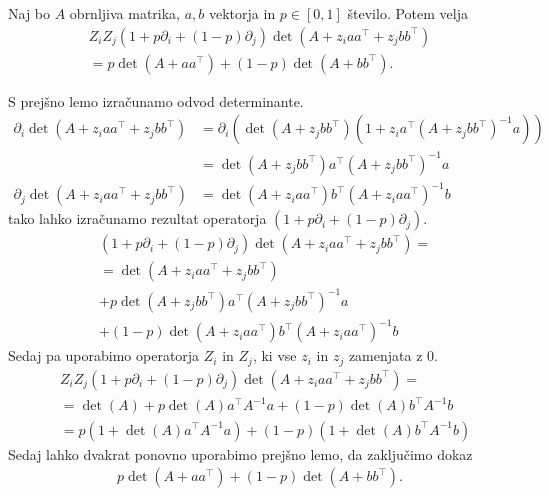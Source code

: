 \begin{lema}\label{zizj-odvod-determinante}
    Naj bo \(A\) obrnljiva matrika, \(a,b\) vektorja in \(p\in [0,1]\) število. Potem velja
    \begin{align*}
        Z_iZ_j(1+p\partial_i + (1-p)\partial_j)\det(A + z_i aa^\top+ z_j bb^\top) \\
        = p\det(A + aa^\top) + (1-p)\det(A+bb^\top).
    \end{align*}
\end{lema}
\begin{dokaz}
    S prejšno lemo izračunamo odvod determinante.
    \begin{align*}
        \partial_i \det(A + z_i aa^\top +z_j bb^\top) & =\partial_i \left(\det(A + z_j bb^\top) (1+ z_i a^\top (A + z_j bb^\top)^{-1} a)\right) \\
                                                      & = \det(A + z_j bb^\top) a^\top (A + z_j bb^\top)^{-1} a                                 \\
        \partial_j \det(A + z_i aa^\top +z_j bb^\top) & = \det(A + z_i aa^\top) b^\top (A + z_i aa^\top)^{-1} b
    \end{align*}
    tako lahko izračunamo rezultat operatorja \((1+p\partial_i + (1-p)\partial_j)\).
    \begin{align*}
         & (1+p\partial_i + (1-p)\partial_j)\det(A + z_i aa^\top + z_j bb^\top) = \\
         & = \det(A + z_i aa^\top + z_j bb^\top)                                  \\
         & + p\det(A + z_j bb^\top) a^\top (A + z_j bb^\top)^{-1} a               \\
         & + (1-p)\det(A + z_i aa^\top) b^\top (A + z_i aa^\top)^{-1} b
    \end{align*}
    Sedaj pa uporabimo operatorja \(Z_i\) in \(Z_j\), ki vse \(z_i\) in \(z_j\) zamenjata z \(0\).
    \begin{align*}
         & Z_iZ_j(1+p\partial_i + (1-p)\partial_j)\det(A + z_i aa^\top+ z_j bb^\top) = \\
         & =\det(A) + p\det(A) a^\top A^{-1} a + (1-p)\det(A) b^\top A^{-1} b          \\
         & = p(1+\det(A) a^\top A^{-1}a) + (1-p)(1+\det(A)b^\top A^{-1} b)
    \end{align*}
    Sedaj lahko dvakrat ponovno uporabimo prejšno lemo, da zaključimo dokaz
    \begin{align*}
        p \det(A + aa^\top) + (1-p)\det(A+bb^\top).
    \end{align*}
\end{dokaz}

